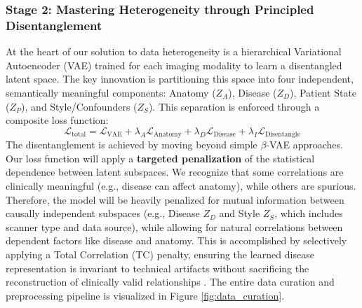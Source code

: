 \documentclass[11pt, a4paper]{article}
\begin{document}
\subsubsection{Stage 2: Mastering Heterogeneity through Principled Disentanglement}
At the heart of our solution to data heterogeneity is a hierarchical Variational Autoencoder (VAE) trained for each imaging modality to learn a disentangled latent space. The key innovation is partitioning this space into four independent, semantically meaningful components: Anatomy ($Z_A$), Disease ($Z_D$), Patient State ($Z_P$), and Style/Confounders ($Z_S$). This separation is enforced through a composite loss function:
$$ \mathcal{L}_{\text{total}} = \mathcal{L}_{\text{VAE}} + \lambda_A \mathcal{L}_{\text{Anatomy}} + \lambda_D \mathcal{L}_{\text{Disease}} + \lambda_I \mathcal{L}_{\text{Disentangle}} $$
The disentanglement is achieved by moving beyond simple $\beta$-VAE approaches. Our loss function will apply a \textbf{targeted penalization} of the statistical dependence between latent subspaces. We recognize that some correlations are clinically meaningful (e.g., disease can affect anatomy), while others are spurious. Therefore, the model will be heavily penalized for mutual information between causally independent subspaces (e.g., Disease $Z_D$ and Style $Z_S$, which includes scanner type and data source), while allowing for natural correlations between dependent factors like disease and anatomy. This is accomplished by selectively applying a Total Correlation (TC) penalty, ensuring the learned disease representation is invariant to technical artifacts without sacrificing the reconstruction of clinically valid relationships \cite{FragemannArdizzone2022, AbbasiMonadjemi2018, FayCobos2023}. The entire data curation and preprocessing pipeline is visualized in Figure \ref{fig:data_curation}.
\end{document}
